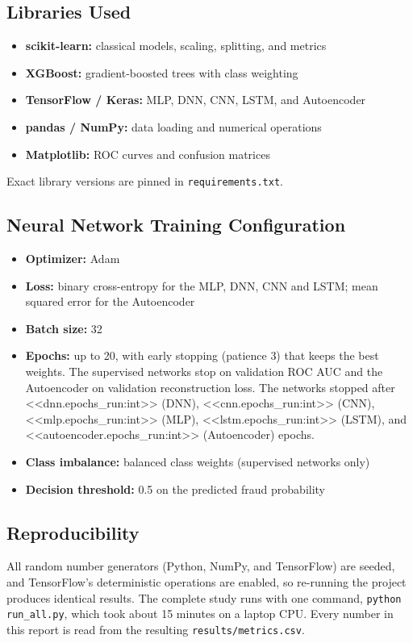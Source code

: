 \documentclass[journal]{IEEEtran}
\begin{document}
\subsection{Libraries Used}
\begin{itemize}
  \item \textbf{scikit-learn:} classical models, scaling, splitting, and metrics
  \item \textbf{XGBoost:} gradient-boosted trees with class weighting
  \item \textbf{TensorFlow / Keras:} MLP, DNN, CNN, LSTM, and Autoencoder
  \item \textbf{pandas / NumPy:} data loading and numerical operations
  \item \textbf{Matplotlib:} ROC curves and confusion matrices
\end{itemize}
Exact library versions are pinned in \texttt{requirements.txt}.

\subsection{Neural Network Training Configuration}\label{sec:nncfg}
\begin{itemize}
  \item \textbf{Optimizer:} Adam
  \item \textbf{Loss:} binary cross-entropy for the MLP, DNN, CNN and LSTM; mean squared error for the Autoencoder
  \item \textbf{Batch size:} 32
  \item \textbf{Epochs:} up to 20, with early stopping (patience 3) that keeps the best weights. The supervised networks stop on validation ROC AUC and the Autoencoder on validation reconstruction loss. The networks stopped after <<dnn.epochs_run:int>> (DNN), <<cnn.epochs_run:int>> (CNN), <<mlp.epochs_run:int>> (MLP), <<lstm.epochs_run:int>> (LSTM), and <<autoencoder.epochs_run:int>> (Autoencoder) epochs.
  \item \textbf{Class imbalance:} balanced class weights (supervised networks only)
  \item \textbf{Decision threshold:} 0.5 on the predicted fraud probability
\end{itemize}

\subsection{Reproducibility}
All random number generators (Python, NumPy, and TensorFlow) are seeded, and TensorFlow's deterministic operations are enabled, so re-running the project produces identical results. The complete study runs with one command, \texttt{python run\_all.py}, which took about 15 minutes on a laptop CPU. Every number in this report is read from the resulting \texttt{results/metrics.csv}.
\end{document}
